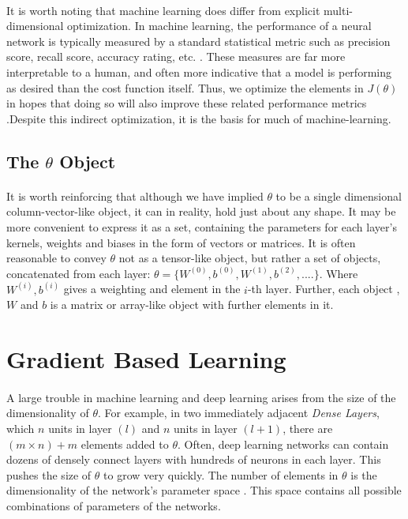\documentclass[12pt,letterpaper]{article}
\begin{document}
\paragraph*{}It is worth noting that machine learning does differ from explicit multi-dimensional optimization. In machine learning, the performance of a neural network is typically measured by a standard statistical metric such as precision score, recall score, accuracy rating, etc. \cite{Geron}. These measures are far more interpretable to a human, and often more indicative that a model is performing as desired than the cost function itself. Thus, we optimize the elements in $J(\theta)$ in hopes that doing so will also improve these related performance metrics \cite{Goodfellow}.Despite this indirect optimization, it is the basis for much of machine-learning.

\subsection{The $\theta$ Object}

\paragraph*{}It is worth reinforcing that although we have implied $\theta$ to be a single dimensional column-vector-like object, it can in reality, hold just about any shape. It may be more convenient to express it as a set, containing the parameters for each layer's kernels, weights and biases in the form of vectors or matrices. It is often reasonable to convey $\theta$ not as a tensor-like object, but rather a set of objects, concatenated from each layer: 
$\theta = \big\{ W^{(0)} , b^{(0)} , W^{(1)} , b^{(2)},.... \big\} $. Where $W^{(i)} , b^{(i)}$ gives a weighting and element in the $i$-th layer. Further, each object , $W$ and $b$ is a matrix or array-like object with further elements in it.




\section{Gradient Based Learning}

\paragraph*{}A large trouble in machine learning and deep learning arises from the size of the dimensionality of $\theta$. For example, in two immediately adjacent \textit{Dense Layers}, which $n$ units in layer $(l)$ and $n$ units in layer $(l+1)$, there are $(m \times n) + m$ elements added to $\theta$. Often, deep learning networks can contain dozens of densely connect layers with hundreds of neurons in each layer. This pushes the size of $\theta$ to grow very quickly. The number of elements in $\theta$ is the dimensionality of the network's parameter space \cite{Goodfellow}. This space contains all possible combinations of parameters of the networks.
\end{document}
